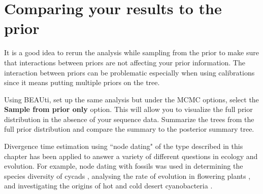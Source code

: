 \documentclass[11pt]{article}
\theoremstyle{plain}%
\theoremstyle{definition}
\theoremstyle{remark}
\begin{document}
\section{Comparing your results to the prior}

It is a good idea to rerun the analysis while sampling from the prior to make sure
that interactions between priors are not affecting your prior information. The
interaction between priors can be problematic especially when using calibrations
since it means putting multiple priors on the tree.

Using BEAUti, set up the same analysis but under the MCMC options, select the {\bf Sample from prior only} option. This will allow you to visualize the full prior distribution in the absence of your sequence data. Summarize the trees from the full prior
distribution and compare the summary to the posterior summary tree.

Divergence time estimation using ``node dating" of the type described in this
chapter has been applied to answer a variety of different questions in ecology
and evolution. For example, node dating with fossils was used in determining
the species diversity of cycads \cite{nagalingum2011recent}, analysing the rate of
evolution in flowering plants \cite{smith2008rates}, and investigating the
origins of hot and cold desert cyanobacteria \cite{bahl2011ancient}.

 









\end{document}
